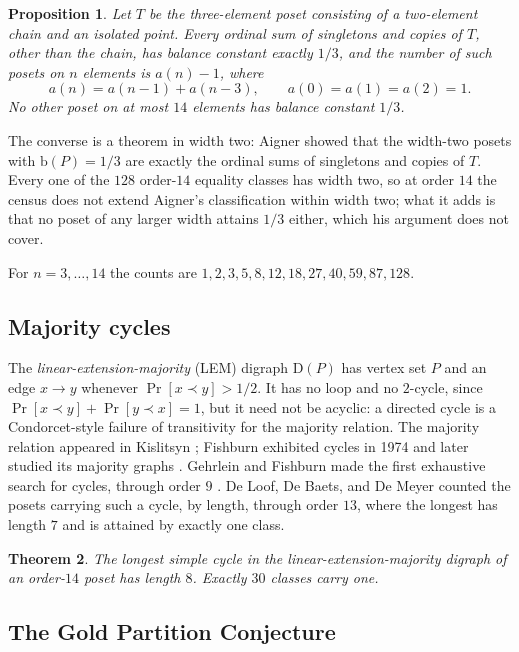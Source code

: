 \documentclass[11pt]{article}
\newtheorem{theorem}{Theorem}
\newtheorem{proposition}[theorem]{Proposition}
\theoremstyle{definition}
\newcommand{\bal}{\mathrm{b}}
\newcommand{\Dig}{\mathrm{D}}
\newcommand{\CEIGHT}{30}
\newcommand{\NEQUALITY}{128}
\begin{document}
\begin{proposition}\label{prop:equality}
Let $T$ be the three-element poset consisting of a two-element chain and an
isolated point.  Every ordinal sum of singletons and copies of $T$, other than
the chain, has balance constant exactly $1/3$, and the number of such posets
on $n$ elements is $a(n)-1$, where
\[
  a(n)=a(n-1)+a(n-3),\qquad a(0)=a(1)=a(2)=1.
\]
No other poset on at most $14$ elements has balance constant $1/3$.
\end{proposition}

The converse is a theorem in width two: Aigner \cite{aigner} showed that the
width-two posets with $\bal(P)=1/3$ are exactly the ordinal sums of singletons
and copies of $T$.  Every one of the $\NEQUALITY$ order-$14$ equality classes
has width two, so at order $14$ the census does not extend Aigner's
classification within width two; what it adds is that no poset of any larger
width attains $1/3$ either, which his argument does not cover.

For $n = 3,\ldots,14$ the counts are
$1, 2, 3, 5, 8, 12, 18, 27, 40, 59, 87, \NEQUALITY$.

\subsection{Majority cycles}

The \emph{linear-extension-majority} (LEM) digraph $\Dig(P)$ has vertex set
$P$ and an edge $x \to y$ whenever $\Pr[x\prec y] > 1/2$.  It has no loop and
no $2$-cycle, since $\Pr[x\prec y]+\Pr[y\prec x]=1$, but it need not be
acyclic: a directed cycle is a Condorcet-style failure of transitivity for the
majority relation.  The majority relation appeared in Kislitsyn
\cite{kislitsyn}; Fishburn exhibited cycles in 1974
\cite{fishburn-cycles} and later studied its majority graphs
\cite{fishburn-lem}.  Gehrlein and Fishburn made the first exhaustive
search for cycles, through order $9$ \cite{gehrlein-fishburn}.  De Loof, De
Baets, and De Meyer \cite{deloof-census} counted the posets carrying such a
cycle, by length, through order $13$, where the longest has length $7$ and is
attained by exactly one class.

\begin{theorem}\label{thm:cycle8}
The longest simple cycle in the linear-extension-majority digraph of an
order-$14$ poset has length $8$.  Exactly $\CEIGHT$ classes carry one.
\end{theorem}

\subsection{The Gold Partition Conjecture}
\end{document}
